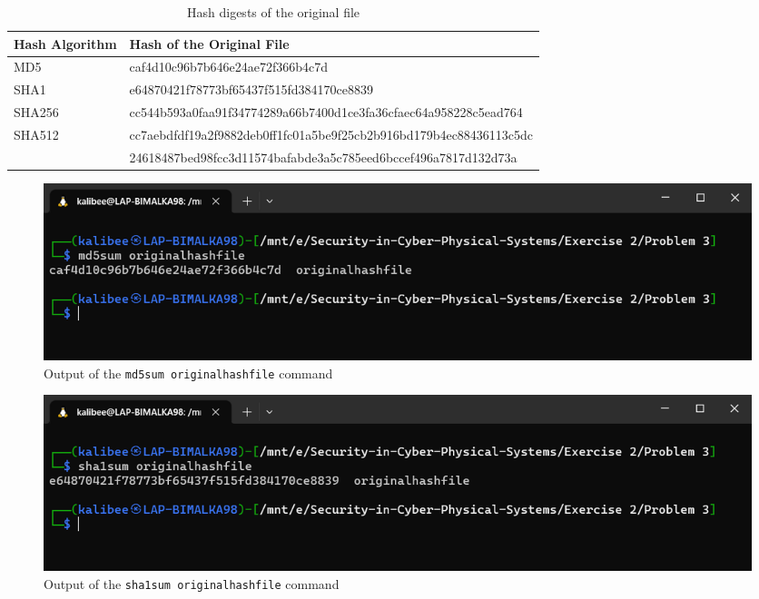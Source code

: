 \documentclass[11pt,letterpaper]{article}
\begin{document}
\begin{enumerate}
				
				
		
		\begin{table}[h!]
			\caption{Hash digests of the original file
			} \label{tab:hash-digest-originalhashfile}
			\begin{tabularx}{\columnwidth}{|p{4cm}|X|}
				\hline
				\textbf{Hash Algorithm} & \textbf{Hash of the Original File} \\
				\hline
				MD5 & caf4d10c96b7b646e24ae72f366b4c7d \\\hline
				
				\hline
				SHA1 & e64870421f78773bf65437f515fd384170ce8839 \\\hline
				
				\hline
				SHA256 & cc544b593a0faa91f34774289a66b7400d1ce3fa36cfaec64a958228c5ead764  \\ \hline
				
				\hline
				SHA512 & cc7aebdfdf19a2f9882deb0ff1fc01a5be9f25cb2b916bd179b4ec88436113c5dc\\ & 24618487bed98fcc3d11574bafabde3a5c785eed6bccef496a7817d132d73a \\ \hline
				
			\end{tabularx}
		\end{table}

		\begin{figure}[H]
			\centering
			\includegraphics[width=0.7\columnwidth]{images/p3/s3}
			\caption{Output of the {\tt md5sum originalhashfile} command} \label{fig:md5sum}
		\end{figure}
	
		\begin{figure}[H]
			\centering
			\includegraphics[width=0.7\columnwidth]{images/p3/s4}
			\caption{Output of the {\tt sha1sum originalhashfile} command} \label{fig:sha1sum}
		\end{figure}
	

\end{enumerate}
\end{document}
